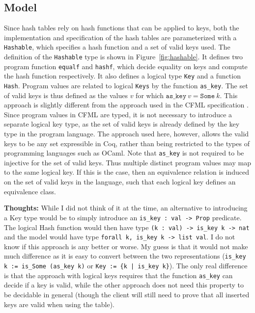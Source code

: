 \documentclass[10pt,a4paper]{article}
\renewcommand{\fcolorbox}[4][]{#4}}
\newcommand{\thoughts}[1]{\noindent\fcolorbox{black}{cyan}{\parbox{\textwidth}{\textbf{Thoughts:} \linebreak #1}}}
\begin{document}
\subsection{Model}
Since hash tables rely on hash functions that can be applied to keys, both the implementation and specification of the hash tables are parameterized with a \texttt{Hashable}, which specifies a hash function and a set of valid keys used. The definition of the \texttt{Hashable} type is shown in Figure~\ref{fig:hashable}. It defines two program function \texttt{equalf} and \texttt{hashf}, which decide equality on keys and compute the hash function respectively. It also defines a logical type \texttt{Key} and a function \texttt{Hash}. Program values are related to logical \texttt{Keys} by the function \texttt{as\_key}. The set of valid keys is thus defined as the values $v$ for which $\mathtt{as\_key} \ v = \mathtt{Some} \ k$. This approach is slightly different from the approach used in the CFML specification \cite{pottier-cpp-17}. Since program values in CFML are typed, it is not necessary to introduce a separate logical key type, as the set of valid keys is already defined by the key type in the program language. The approach used here, however, allows the valid keys to be any set expressible in Coq, rather than being restricted to the types of programming languages such as OCaml. Note that \texttt{as\_key} is not required to be injective for the set of valid keys. Thus multiple distinct program values may map to the same logical key. If this is the case, then an equivalence relation is induced on the set of valid keys in the language, such that each logical key defines an equivalence class.

\thoughts{While I did not think of it at the time, an alternative to introducing a Key type would be to simply introduce an \texttt{is\_key : val -> Prop} predicate. The logical Hash function would then have type \texttt{(k : val) -> is\_key k -> nat} and the model would have type \texttt{forall k, is\_key k -> list val}. I do not know if this approach is any better or worse. My guess is that it would not make much difference as it is easy to convert between the two representations (\texttt{is\_key k := is\_Some (as\_key k)} or \texttt{Key := \{k | is\_key k\}}). The only real difference is that the approach with logical keys requires that the function \texttt{as\_key} can decide if a key is valid, while the other approach does not need this property to be decidable in general (though the client will still need to prove that all inserted keys are valid when using the table).}
\end{document}
